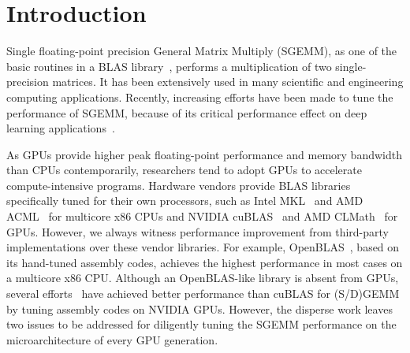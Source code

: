 \section{Introduction}
Single floating-point precision General Matrix Multiply (SGEMM), as one 
of the basic routines in a BLAS library~\cite{blas,intel2007intel,amd2014}, performs a multiplication of two single-precision matrices. 
It has been extensively used in many scientific and engineering 
computing applications. 
Recently, increasing efforts have been made to tune the performance of SGEMM, because of its critical performance effect on deep learning applications~\cite{chetlur2014cudnn,nervana_sgemm_wiki}.

As GPUs provide higher peak floating-point performance and memory bandwidth than CPUs contemporarily, researchers tend to adopt GPUs to accelerate compute-intensive programs. 
Hardware vendors provide BLAS libraries specifically tuned for their own processors, such as Intel MKL~\cite{intel2007intel} and AMD ACML~\cite{amd2014} for multicore x86 CPUs and NVIDIA cuBLAS~\cite{intel2007intel} and AMD CLMath~\cite{clmath} for GPUs. 
However, we always witness performance improvement from third-party implementations over these vendor libraries. 
For example, OpenBLAS~\cite{xianyi2012openblas}, based on its hand-tuned assembly codes, achieves the highest performance in most cases on a multicore x86 CPU.
Although an OpenBLAS-like library is absent from GPUs, several %
efforts~\cite{tan,lai,nervana_sgemm_wiki,
chien, volkov} have achieved better performance than cuBLAS for (S/D)GEMM by tuning assembly codes on NVIDIA GPUs. 
However, %
the disperse work leaves two issues to be addressed for diligently tuning the SGEMM performance on the microarchitecture of every GPU generation.

